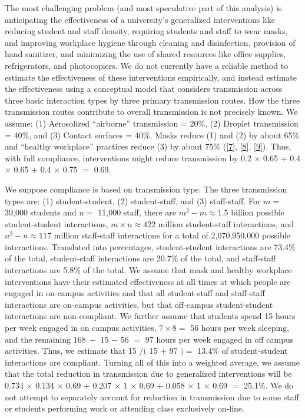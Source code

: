 \documentclass[
]{article}
\begin{document}
The most challenging problem (and most speculative part of this
analysis) is anticipating the effectiveness of a university's
generalized interventions like reducing student and staff density,
requiring students and staff to wear masks, and improving workplace
hygiene through cleaning and disinfection, provision of hand sanitizer,
and minimizing the use of shared resources like office supplies,
refrigerators, and photocopiers. We do not currently have a reliable
method to estimate the effectiveness of these interventions empirically,
and instead estimate the effectiveness using a conceptual model that
considers transmission across three basic interaction types by three
primary transmission routes. How the three transmission routes
contribute to overall transmission is not precisely known. We assume:
(1) Aerosolized ``airborne'' transmission = 20\%, (2) Droplet
transmission = 40\%, and (3) Contact surfaces = 40\%. Masks reduce (1)
and (2) by about 65\% and ``healthy workplace'' practices reduce (3) by
about 75\% ({[}\protect\hyperlink{ref-Offeddu2017-ae}{7}{]},
{[}\protect\hyperlink{ref-Bowen2010-ht}{8}{]},
{[}\protect\hyperlink{ref-Reynolds2016-oy}{9}{]}). Thus, with full
compliance, interventions might reduce transmission by 0.2 \(\times\)
0.65 + 0.4 \(\times\) 0.65 + 0.4 \(\times\) 0.75 \(=\) 0.69.

We suppose compliance is based on transmission type. The three
transmission types are: (1) student-student, (2) student-staff, and (3)
staff-staff. For \(m=\) 39,000 students and \(n=\) 11,000 staff, there
are \(m^2-m \approx 1.5 \text{ billion}\) possible student-student
interactions, \(m \times n \approx 422 \text{ million}\) student-staff
interactions, and \(n^2-n \approx 117 \text{ million}\) staff-staff
interactions for a total of 2,070,950,000 possible interactions.
Translated into percentages, student-student interactions are 73.4\% of
the total, student-staff interactions are 20.7\% of the total, and
staff-staff interactions are 5.8\% of the total. We assume that mask and
healthy workplace interventions have their estimated effectiveness at
all times at which people are engaged in on-campus activities and that
all student-staff and staff-staff interactions are on-campus activities,
but that off-campus student-student interactions are non-compliant. We
further assume that students spend 15 hours per week engaged in on
campus activities, \(7 \times 8 =\) 56 hours per week sleeping, and the
remaining \(168~-\) 15 \(-\) 56 \(=\) 97 hours per week engaged in off
campus activities. Thus, we estimate that 15 \(/(\) 15 \(+\) 97 \()=\)
13.4\% of student-student interactions are compliant. Turning all of
this into a weighted average, we assume that the total reduction in
transmission due to generalized interventions will be 0.734 \(\times\)
0.134 \(\times\) 0.69 \(+\) 0.207 \(\times\) 1 \(\times\) 0.69 \(+\)
0.058 \(\times\) 1 \(\times\) 0.69 \(=\) 25.1\%. We do not attempt to
separately account for reduction in transmission due to some staff or
students performing work or attending class exclusively on-line.
\end{document}
